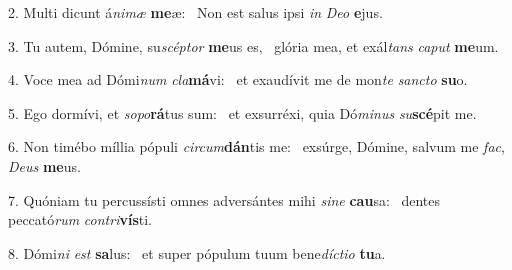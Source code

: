 2. Multi dicunt á\textit{ni}\textit{mæ} \textbf{me}æ: \ast\  Non est salus ipsi \textit{in} \textit{De}\textit{o} \textbf{e}jus.\

3. Tu autem, Dómine, su\textit{scép}\textit{tor} \textbf{me}us es, \ast\  glória mea, et exál\textit{tans} \textit{ca}\textit{put} \textbf{me}um.\

4. Voce mea ad Dómi\textit{num} \textit{cla}\textbf{má}vi: \ast\  et exaudívit me de mon\textit{te} \textit{sanc}\textit{to} \textbf{su}o.\

5. Ego dormívi, et \textit{so}\textit{po}\textbf{rá}tus sum: \ast\  et exsurréxi, quia Dó\textit{mi}\textit{nus} \textit{su}\textbf{scé}pit me.\

6. Non timébo míllia pópuli \textit{cir}\textit{cum}\textbf{dán}tis me: \ast\  exsúrge, Dómine, salvum me \textit{fac}, \textit{De}\textit{us} \textbf{me}us.\

7. Quóniam tu percussísti omnes adversántes mihi \textit{si}\textit{ne} \textbf{cau}sa: \ast\  dentes peccató\textit{rum} \textit{con}\textit{tri}\textbf{vís}ti.\

8. Dómi\textit{ni} \textit{est} \textbf{sa}lus: \ast\  et super pópulum tuum bene\textit{díc}\textit{ti}\textit{o} \textbf{tu}a.\

